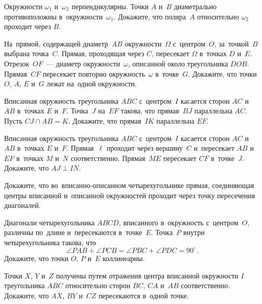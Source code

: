 


\begin{problems}

\item
Окружности $\omega_{1}$ и~$\omega_{2}$ перпендикулярны.
Точки $A$ и~$B$ диаметрально противоположны в~окружности~$\omega_{1}$.
Докажите, что поляра~$A$ относительно $\omega_{2}$ проходит через $B$.

\item
На~прямой, содержащей диаметр~$AB$ окружности~$\Omega$ с~центром~$O$,
за~точкой~$B$ выбрана точка~$C$.
Прямая, проходящая через $C$, пересекает $\Omega$ в~точках $D$ и~$E$.
Отрезок~$OF$~--- диаметр окружности~$\omega$, описанной около
треугольника $DOB$.
Прямая~$CF$ пересекает повторно окружность~$\omega$ в~точке~$G$.
Докажите, что точки $O$, $A$, $E$ и~$G$ лежат на~одной окружности.

\item
Вписанная окружность треугольника $ABC$ с~центром~$I$ касается
сторон $AC$ и~$AB$ в~точках $E$ и~$F$.
Точка~$J$ на~$EF$ такова, что прямая~$BJ$ параллельна $AC$.
Пусть $CJ \cap AB = K$.
Докажите, что прямая~$IK$ параллельна $EF$.

\item
Вписанная окружность треугольника $ABC$ с~центром~$I$ касается
сторон $AC$ и~$AB$ в~точках $E$ и~$F$.
Прямая~$\ell$ проходит через вершину~$C$ и~пересекает $AB$ и~$EF$
в~точках $M$ и~$N$ соответственно.
Прямая~$ME$ пересекает $CF$ в~точке~$J$.
Докажите, что $AJ \perp IN$.

\item
Докажите, что во~вписанно-описанном четырехугольнике прямая, соединяющая центры
вписанной и~описанной окружностей проходит через точку пересечения диагоналей.

\item
Диагонали четырехугольника $ABCD$, вписанного в~окружность с~центром~$O$,
различны по~длине и~пересекаются в~точке~$E$.
Точка~$P$ внутри четырехугольника такова, что
\[
    \angle PAB + \angle PCB = \angle PBC + \angle PDC = 90^\circ
\, . \]
Докажите, что точки $O$, $P$ и~$E$ коллинеарны.

\item
Точки $X$, $Y$ и~$Z$ получены путем отражения центра вписанной окружности $I$
треугольника $ABC$ относительно сторон $BC$, $CA$ и~$AB$ соответственно.
Докажите, что $AX$, $BY$ и~$CZ$ пересекаются в~одной точке.


\end{problems}
